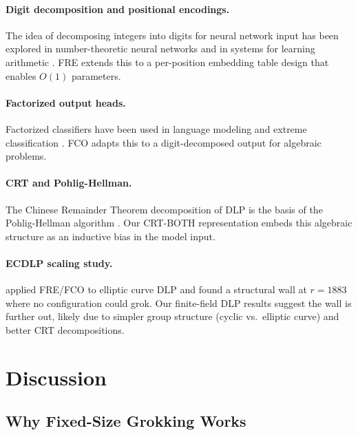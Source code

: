 \documentclass[11pt]{article}
\begin{document}
\paragraph{Digit decomposition and positional encodings.} The idea of decomposing integers into digits for neural network input has been explored in number-theoretic neural networks \citep{charton2022linear} and in systems for learning arithmetic \citep{charton2021deep}. FRE extends this to a per-position embedding table design that enables $O(1)$ parameters.

\paragraph{Factorized output heads.} Factorized classifiers have been used in language modeling \citep{bengio2003neural, mikolov2013distributed} and extreme classification \citep{weston2013label}. FCO adapts this to a digit-decomposed output for algebraic problems.

\paragraph{CRT and Pohlig-Hellman.} The Chinese Remainder Theorem decomposition of DLP is the basis of the Pohlig-Hellman algorithm \citep{pohlig1978improved}. Our CRT-BOTH representation embeds this algebraic structure as an inductive bias in the model input.

\paragraph{ECDLP scaling study.} \citet{svensson2026ecdlp} applied FRE/FCO to elliptic curve DLP and found a structural wall at $r = 1883$ where no configuration could grok. Our finite-field DLP results suggest the wall is further out, likely due to simpler group structure (cyclic vs.\ elliptic curve) and better CRT decompositions.



\section{Discussion}
\label{sec:discussion}

\subsection{Why Fixed-Size Grokking Works}
\end{document}

